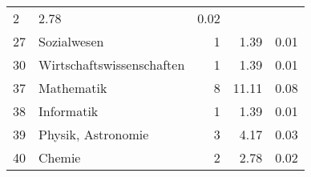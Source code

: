 \begin{longtable}{lXrrr}
       \num{2} &
       \num[round-mode=places,round-precision=2]{2,78} &
         \num[round-mode=places,round-precision=2]{0,02} \\

     27 &
     \multicolumn{1}{X}{ Sozialwesen   } &


       \num{1} &
       \num[round-mode=places,round-precision=2]{1,39} &
         \num[round-mode=places,round-precision=2]{0,01} \\

     30 &
     \multicolumn{1}{X}{ Wirtschaftswissenschaften   } &


       \num{1} &
       \num[round-mode=places,round-precision=2]{1,39} &
         \num[round-mode=places,round-precision=2]{0,01} \\

     37 &
     \multicolumn{1}{X}{ Mathematik   } &


       \num{8} &
       \num[round-mode=places,round-precision=2]{11,11} &
         \num[round-mode=places,round-precision=2]{0,08} \\

     38 &
     \multicolumn{1}{X}{ Informatik   } &


       \num{1} &
       \num[round-mode=places,round-precision=2]{1,39} &
         \num[round-mode=places,round-precision=2]{0,01} \\

     39 &
     \multicolumn{1}{X}{ Physik, Astronomie   } &


       \num{3} &
       \num[round-mode=places,round-precision=2]{4,17} &
         \num[round-mode=places,round-precision=2]{0,03} \\

     40 &
     \multicolumn{1}{X}{ Chemie   } &


       \num{2} &
       \num[round-mode=places,round-precision=2]{2,78} &
         \num[round-mode=places,round-precision=2]{0,02} \\


\end{longtable}
